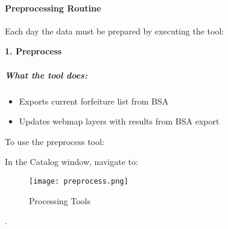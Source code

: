  \paragraph{Preprocessing Routine}

 \vspace{.2in}

 Each day the data must be prepared by executing the tool:
 \vspace{.2in}

 \textbf{1. Preprocess}

 \vspace{.2in}

  \subparagraph*{What the tool does:}
  \vspace{.15in}

  \begin{itemize}
  \item Exports current forfeiture list from BSA
  \item Updates webmap layers with results from BSA export
  \end{itemize}
  To use the preprocess tool:
 \vspace{.15in}

 \noindent In the Catalog window, navigate to:

 \noindent \textcolor{HyperlinkBlue1}{\scriptsize{}}
  \begin{wrapfigure}{r}{0.5\textwidth}
  \centering
      \texttt{[image: preprocess.png]}
  \vspace{-.1in}

  \caption{Processing Tools}
  \end{wrapfigure}
  .
  \vspace{2in}

  \vspace{.5in}



 \clearpage






